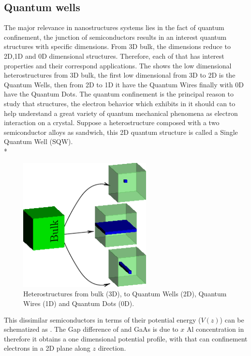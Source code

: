 \subsection{Quantum wells}
\label{subsection:chapter-1-quantum-wells}
\vspace{-10mm} 
The major relevance in nanostructures systems lies in the fact of quantum confinement,
the junction of semiconductors results in an interest quantum structures with specific
dimensions. From 3D bulk, the dimensions reduce to 2D,1D and 0D dimensional structures.
Therefore, each of that has interest properties and their correspond applications. The
 shows the low dimensional heterostructures from 3D bulk, the first low dimensional from 3D to 2D is the Quantum Wells, then from 2D to 1D it have the
Quantum Wires finally with 0D have the Quantum Dots. The quantum confinement
is the principal reason to study that structures, the electron behavior which exhibits
in it should can to help understand a great variety of quantum mechanical phenomena
as electron interaction on a crystal. Suppose a heterostructure composed with a two
semiconductor alloys as sandwich, this 2D quantum structure is called a Single Quantum
Well (SQW).\\*
\begin{figure}
	\centering
	\includegraphics[width=0.6\textwidth]{../figures/chapter-1/heterostructures/out/lds-00}
	\caption{Heterostructures from bulk (3D), to Quantum Wells (2D), Quantum Wires (1D) and Quantum Dots (0D).  }
	\label{fig:subsection-1.2-heterostructures}
\end{figure}
This dissimilar semiconductors in terms of their potential energy ($V(z)$) can be schematized as . The Gap difference of \algaas and GaAs is due to $x$ Al concentration in \algaas therefore it obtains a one dimensional potential profile, with that can confinement electrons in a 2D plane along $z$ direction. 
